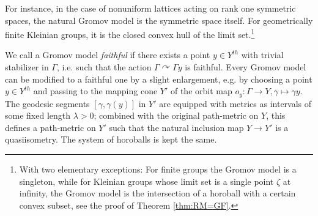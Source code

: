 \documentclass[12pt]{article}
\theoremstyle{boldplain}
\theoremstyle{bolddefinition}
\numberwithin{equation}{section}
\def\ga{\gamma}
\def\Ga{\Gamma}
\def\la{\lambda}
\def\acts{\curvearrowright}
\begin{document}
For instance, 
in the case of nonuniform lattices acting on rank one symmetric spaces,
the natural Gromov model is the symmetric space itself.
For geometrically finite Kleinian groups, it is the closed convex hull of the limit set.\footnote{With two elementary exceptions: 
For finite groups the Gromov model is a singleton, while for Kleinian groups whose limit set is a single point $\zeta$ at infinity, 
the Gromov model is the intersection of a horoball with a certain convex subset, see the proof of Theorem \ref{thm:RM=GF}.} 

We call a Gromov model  {\em faithful} if there exists a point $y\in Y^{th}$ 
with trivial stabilizer in $\Ga$,
i.e. such that the action $\Ga\acts \Ga y$ is faithful. 
Every Gromov model can be modified to a faithful one by a slight enlargement,
e.g. by choosing a point $y\in Y^{th}$ and passing to the mapping cone $Y'$ of the orbit map 
$o_y: \Ga\to Y,\ga\mapsto\ga y$.
The geodesic segments $[\ga, \ga(y)]$ in $Y'$ 
are equipped with metrics as intervals of some fixed length $\la>0$; 
combined with the original path-metric on $Y$, this defines a path-metric on $Y'$ such that the natural inclusion map $Y\to Y'$ 
is a quasiisometry.  
The system of horoballs is kept the same. 
\end{document}
